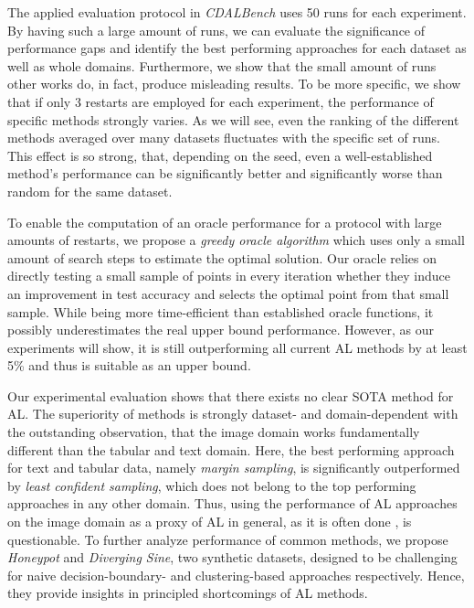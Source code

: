 \documentclass[]{article}
\begin{document}
The applied evaluation protocol in \emph{CDALBench} uses 50 runs for
each experiment. By having such a large amount of runs, we can evaluate the
significance of performance gaps and identify the best performing
approaches for each dataset as well as whole domains. 
Furthermore, we show that the small amount of runs other works do, in fact, 
produce misleading results. 
To be more specific, we show that if only 3 restarts are employed for each experiment, 
the performance of specific methods strongly varies. As we will see, even the ranking of
the different methods averaged over many datasets fluctuates with the specific set of runs. 
This effect is so strong, that, depending on the seed, even a well-established method's performance can be significantly better and significantly worse than random for the same dataset. 

To enable the computation of an oracle performance for a protocol with large amounts of restarts,
we propose a \emph{greedy oracle algorithm} 
which uses only a small amount of search steps to estimate the
optimal solution. 
Our oracle relies on directly testing a small sample of points in every iteration whether they induce an improvement in test accuracy and selects the optimal point from that small sample.
While being more time-efficient than established oracle
functions, it possibly underestimates the real upper bound performance. 
However, as our experiments will show, it is still outperforming all current AL methods
by at least 5\% and thus is suitable as an upper bound.

Our experimental evaluation shows that there exists no clear SOTA
method for AL. The superiority of methods is strongly dataset- and
domain-dependent with the outstanding observation, that the image domain works
fundamentally different than the tabular and text domain. Here, the best
performing approach for text and tabular data, namely \emph{margin sampling}, is
significantly outperformed by \emph{least confident sampling}, which does not belong to
the top performing approaches in any other domain. Thus, using the performance
of AL approaches on the image domain as a proxy of AL
in general, as it is often done \cite{beck2021effective, munjal2022towards, li2022empirical, ji2023randomness, luth2024navigating}, is questionable. To further analyze
performance of common methods, we propose \emph{Honeypot} and \emph{Diverging Sine}, two
synthetic datasets, designed to be challenging for naive decision-boundary- and clustering-based approaches respectively. Hence, they provide insights in principled shortcomings of AL methods.
\end{document}
